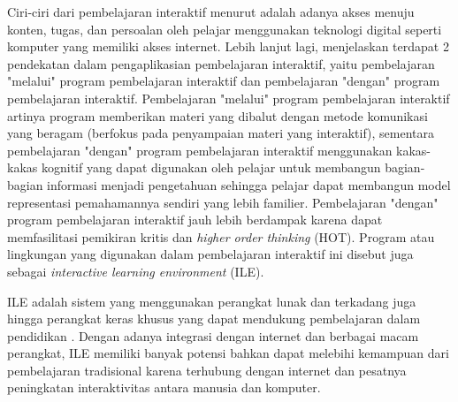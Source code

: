 Ciri-ciri dari pembelajaran interaktif menurut \textcite{reeves2012interactive} adalah adanya akses menuju konten, tugas, dan persoalan oleh pelajar menggunakan teknologi digital seperti komputer yang memiliki akses internet. Lebih lanjut lagi, \textcite{reeves2012interactive} menjelaskan terdapat 2 pendekatan dalam pengaplikasian pembelajaran interaktif, yaitu pembelajaran "melalui" program pembelajaran interaktif dan pembelajaran "dengan" program pembelajaran interaktif. Pembelajaran "melalui" program pembelajaran interaktif artinya program memberikan materi yang dibalut dengan metode komunikasi yang beragam (berfokus pada penyampaian materi yang interaktif), sementara pembelajaran "dengan" program pembelajaran interaktif menggunakan kakas-kakas kognitif yang dapat digunakan oleh pelajar untuk membangun bagian-bagian informasi menjadi pengetahuan sehingga pelajar dapat membangun model representasi pemahamannya sendiri yang lebih familier. Pembelajaran "dengan" program pembelajaran interaktif jauh lebih berdampak karena dapat memfasilitasi pemikiran kritis dan \textit{higher order thinking} (HOT). Program atau lingkungan yang digunakan dalam pembelajaran interaktif ini disebut juga sebagai \textit{interactive learning environment} (ILE).


ILE adalah sistem yang menggunakan perangkat lunak dan terkadang juga hingga perangkat keras khusus yang dapat mendukung pembelajaran dalam pendidikan \parencite{psotka2012ile}. Dengan adanya integrasi dengan internet dan berbagai macam perangkat, ILE memiliki banyak potensi bahkan dapat melebihi kemampuan dari pembelajaran tradisional karena terhubung dengan internet dan pesatnya peningkatan interaktivitas antara manusia dan komputer.

